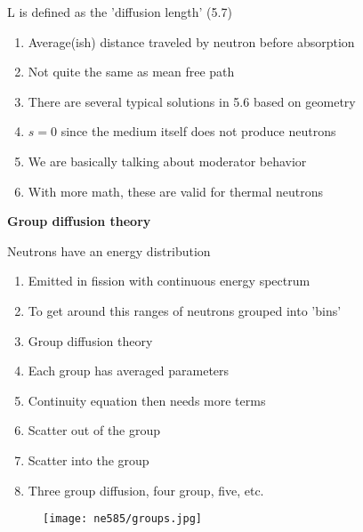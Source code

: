 \documentclass[aspectratio=1610,pdftex,dvipsnames,compress,xcolor={dvipsnames}]{beamer}
\begin{document}
\addtocounter{framenumber}{-1} 
\begin{frame}{L is defined as the 'diffusion length' (5.7)}
    \begin{enumerate}[series=outerlist,topsep=0pt,itemsep=21pt,leftmargin=*,label=(\arabic*)]
        \item[]Average(ish) distance traveled by neutron before absorption
        \item[]Not quite the same as mean free path
        \item[]There are several typical solutions in 5.6 based on geometry
        \item[]$s = 0$ since the medium itself does not produce neutrons
        \item[]We are basically talking about moderator behavior
        \item[]With more math, these are valid for thermal neutrons
    \end{enumerate}
\end{frame}


\begin{frame}[plain]{}
    \centering\LARGE\textbf{Group diffusion theory}
\end{frame}


\addtocounter{framenumber}{-1} 
\begin{frame}{Neutrons have an energy distribution}
    \begin{enumerate}[series=outerlist,topsep=0pt,itemsep=17pt,leftmargin=*,label=(\arabic*)]
        \item[]Emitted in fission with continuous energy spectrum
        \item[]To get around this ranges of neutrons grouped into 'bins'
        \item[]Group diffusion theory
        \item[]Each group has averaged parameters
        \item[]Continuity equation then needs more terms
        \item[]Scatter out of the group
        \item[]Scatter into the group
        \item[]Three group diffusion, four group, five, etc.
    \end{enumerate}
\end{frame}


\begin{frame}{}
    \begin{figure}
        \centering
        \texttt{[image: ne585/groups.jpg]}
    \end{figure}
\end{frame}
\end{document}
